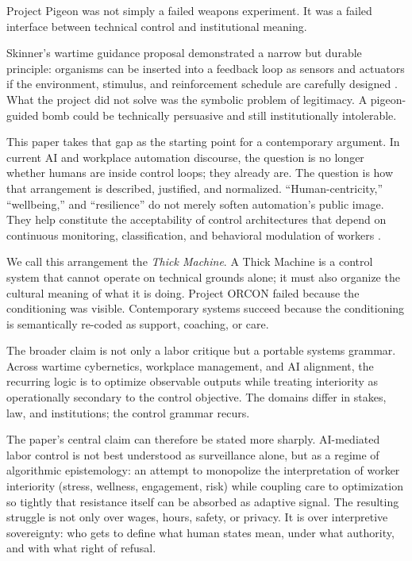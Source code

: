 \documentclass[runningheads]{llncs}
\begin{document}
Project Pigeon was not simply a failed weapons experiment. It was a failed interface between technical control and institutional meaning.

Skinner's wartime guidance proposal demonstrated a narrow but durable principle: organisms can be inserted into a feedback loop as sensors and actuators if the environment, stimulus, and reinforcement schedule are carefully designed \cite{skinner1960pigeons,capshew1993engineering}. What the project did not solve was the symbolic problem of legitimacy. A pigeon-guided bomb could be technically persuasive and still institutionally intolerable.

This paper takes that gap as the starting point for a contemporary argument. In current AI and workplace automation discourse, the question is no longer whether humans are inside control loops; they already are. The question is how that arrangement is described, justified, and normalized. ``Human-centricity,'' ``wellbeing,'' and ``resilience'' do not merely soften automation's public image. They help constitute the acceptability of control architectures that depend on continuous monitoring, classification, and behavioral modulation of workers \cite{breque2021industry,kellogg2020algorithms}.

We call this arrangement the \emph{Thick Machine}. A Thick Machine is a control system that cannot operate on technical grounds alone; it must also organize the cultural meaning of what it is doing. Project ORCON failed because the conditioning was visible. Contemporary systems succeed because the conditioning is semantically re-coded as support, coaching, or care.

The broader claim is not only a labor critique but a portable systems grammar. Across wartime cybernetics, workplace management, and AI alignment, the recurring logic is to optimize observable outputs while treating interiority as operationally secondary to the control objective. The domains differ in stakes, law, and institutions; the control grammar recurs.

The paper's central claim can therefore be stated more sharply. AI-mediated labor control is not best understood as surveillance alone, but as a regime of algorithmic epistemology: an attempt to monopolize the interpretation of worker interiority (stress, wellness, engagement, risk) while coupling care to optimization so tightly that resistance itself can be absorbed as adaptive signal. The resulting struggle is not only over wages, hours, safety, or privacy. It is over interpretive sovereignty: who gets to define what human states mean, under what authority, and with what right of refusal.
\end{document}
